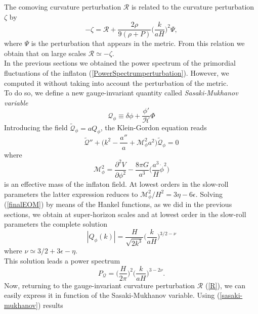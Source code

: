 \documentclass[11pt,a4paper,twoside]{book}
\begin{document}
The comoving curvature perturbation $\mathcal{R}$ is related to the curvature perturbation $\zeta$ by
\begin{equation}
	- \zeta = \mathcal{R} + \frac{2\rho}{9(\rho + P)} \Big (\frac{k}{aH}\Big)^{2}\Psi,
\end{equation}
where $\Psi$ is the perturbation that appears in the metric. 
From this relation we obtain that on large scales $\mathcal{R} \simeq -\zeta$.\\
In the previous sections we obtained the power spectrum of  the primordial fluctuations of the inflaton (\ref{PowerSpectrumperturbation}). However, we computed it without taking into account the perturbation of the metric.\\
To do so, we define a new gauge-invariant quantity called  \textit{Sasaki-Mukhanov variable}
\begin{equation}
	\label{sasaki-mukhanov}
	\mathcal{Q}_{\phi} \equiv \delta \phi + \frac{\phi'}{\mathcal{H}}\Phi 
\end{equation}
Introducing the field $\tilde{\mathcal{Q}}_{\phi}=aQ_{\phi}$, the Klein-Gordon equation reads \cite{NonGauss:Intro}
\begin{equation}
	\label{finalEOM}
\tilde{\mathcal{Q}}'' + \Big (k^{2} - \frac{a''}{a} + \mathcal{M}_{\phi}^{2}a^{2}\Big)\tilde{\mathcal{Q}}_{\phi} = 0
\end{equation} 
where 
\begin{equation}
 \mathcal{M}^{2}_{\phi}=\frac{\partial^{2} V}{\partial \phi^{2}} - \frac{8\pi G}{a^{3}}\Big (\frac{a^{3}}{H}\dot{\phi}^{2}\Big)
\end{equation}
is an effective mass of the inflaton field. At lowest orders in the slow-roll parameters the latter expression reduces to $ \mathcal{M}^{2}_{\phi}/H^{2} = 3\eta-6\epsilon $. Solving (\ref{finalEOM}) by means of the Hankel functions, as we did in the previous sections, we obtain at super-horizon scales and at  lowest order in the slow-roll parameters the complete solution
\begin{equation}
	\label{solutionPerturbation}
	|Q_{\phi}(k)| = \frac{H}{\sqrt{2k^{3}}}\Big (\frac{k}{aH}\Big)^{3/2-\nu}
\end{equation}
where $ \nu \simeq 3/2 + 3\epsilon - \eta $.\\
This solution leads a power spectrum
\begin{equation}
\label{PSQ}
P_{\mathcal{Q}}=\Big (\frac{H}{2\pi} \Big)^{2}\Big(\frac{k}{aH}\Big)^{3-2\nu}.
\end{equation}
Now, returning to the gauge-invariant curvature perturbation $ \mathcal{R} $ (\ref{R}), we can easily express it in function of the Sasaki-Mukhanov variable. Using (\ref{sasaki-mukhanov}) results
\end{document}

